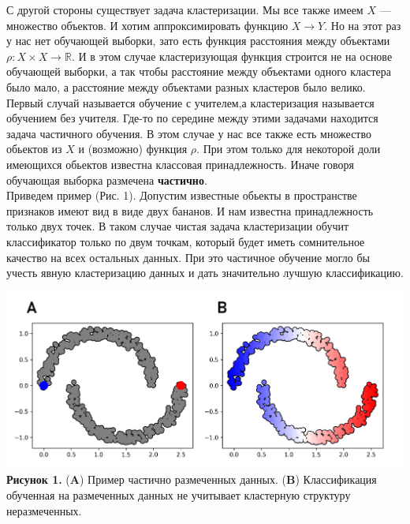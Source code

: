 С другой стороны существует задача кластеризации. Мы все также имеем $X$ --- множество объектов. И хотим аппроксимировать функцию $X \longrightarrow Y$. Но на этот раз у нас нет обучающей выборки, зато есть функция расстояния между объектами $\rho: X\times X \longrightarrow \mathbb{R}$. И в этом случае кластеризующая функция строится не на основе обучающей выборки, а так чтобы расстояние между объектами одного кластера было мало, а расстояние между объектами разных кластеров было велико. \\

Первый случай называется обучение с учителем,а кластеризация называется обучением без учителя. Где-то по середине между этими задачами находится задача частичного обучения. В этом случае у нас все также есть множество обьектов из $X$ и (возможно) функция $\rho$. При этом только для некоторой доли имеющихся обьектов известна классовая принадлежность. Иначе говоря обучающая выборка размечена \textbf{частично}. \\

Приведем пример (Рис. 1). Допустим известные обьекты в пространстве признаков имеют вид в виде двух бананов. И нам известна принадлежность только двух точек. В таком случае чистая задача кластеризации обучит классификатор только по двум точкам, который будет иметь сомнительное качество на всех остальных данных. При это частичное обучение могло бы учесть явную кластеризацию данных и дать значительно лучшую классификацию.\\

\begin{center}
\includegraphics[width=1.0\textwidth]{chapters/clustering/picture_1.png}
\textbf{Рисунок 1.} (\textbf{A}) Пример частично размеченных данных. (\textbf{B}) Классификация обученная на размеченных данных не учитывает кластерную структуру неразмеченных. 
\end{center}

